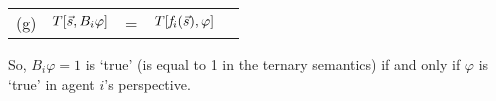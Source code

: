 \vspace{2mm}
\noindent
\begin{tabular}{@{}lllll}


 (g) & $T[\Vec{s}, B_i \varphi]$ & = & $ T[\mathit{f}_i(\Vec{s}), \varphi]$  \\[1mm] 
\end{tabular}
\vspace{2mm}

So, $B_i \varphi = 1$ is `true' (is equal to 1 in the ternary semantics) if and only if $\varphi$ is `true' in agent $i$'s perspective. 


